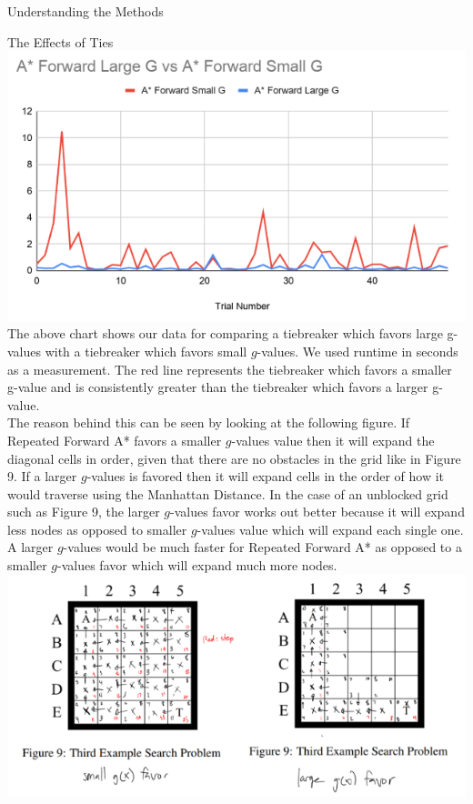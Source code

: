\documentclass[12pt]{article}
\theoremstyle{definition}
\begin{document}
\begin{onehalfspacing}
\begin{section}{Understanding the Methods}
\begin{enumerate}
\end{enumerate}

\end{section}

\begin{section}{The Effects of Ties}
\includegraphics[scale=.8]{images/Tiebreaker Experiment.png}\\
The above chart shows our data for comparing a tiebreaker which favors large g-values with a tiebreaker which favors small $g$-values. We used runtime in seconds as a measurement. The red line represents the tiebreaker which favors a smaller g-value and is consistently greater than the tiebreaker which favors a larger g-value.\\[0.5em]
The reason behind this can be seen by looking at the following figure. If Repeated Forward A* favors a smaller $g$-values value then it will expand the diagonal cells in order, given that there are no obstacles in the grid like in Figure 9. If a larger $g$-values is favored then it will expand cells in the order of how it would traverse using the Manhattan Distance. In the case of an unblocked grid such as Figure 9, the larger $g$-values favor works out better because it will expand less nodes as opposed to smaller $g$-values value which will expand each single one. A larger $g$-values would be much faster for Repeated Forward A* as opposed to a smaller $g$-values favor which will expand much more nodes. \\
\includegraphics[scale=0.85]{images/Tiebreaker Diagram.png}


\end{section}
\end{onehalfspacing}
\end{document}
